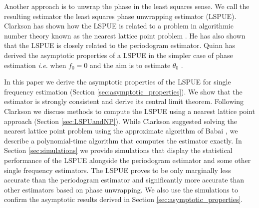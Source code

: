 Another approach is to unwrap the phase in the least squares sense.  We call
the resulting estimator the least squares phase unwrapping estimator (LSPUE).
Clarkson has shown how the LSPUE is related to a problem in algorithmic number
theory known as the nearest lattice point problem \cite{Clarkson1999,
  Agrell2002}.  He has also shown that the LSPUE is closely related to the
periodogram estimator.  Quinn has derived the asymptotic properties of a LSPUE
in the simpler case of phase estimation \emph{i.e.} when $f_0 = 0$ and the aim
is to estimate $\theta_0$ \cite{Quinn2007}.

In this paper we derive the asymptotic properties of the LSPUE for single
frequency estimation (Section \ref{sec:asymptotic_properties}).  We show that
the estimator is strongly consistent and derive its central limit
theorem. Following Clarkson \cite{Clarkson1999} we discuss methods to compute
the LSPUE using a nearest lattice point approach (Section
\ref{sec:LSPUandNP}).  While Clarkson suggested solving the nearest lattice
point problem using the approximate algorithm of Babai \cite{Babai1986}, we
describe a polynomial-time algorithm that computes the estimator exactly.  In
Section \ref{sec:simulations} we provide simulations that display the
statistical performance of the LSPUE alongside the periodogram estimator and
some other single frequency estimators.  The LSPUE proves to be only
marginally less accurate than the periodogram estimator and significantly more
accurate than other estimators based on phase unwrapping. We also use the
simulations to confirm the asymptotic results derived in Section
\ref{sec:asymptotic_properties}.


%


